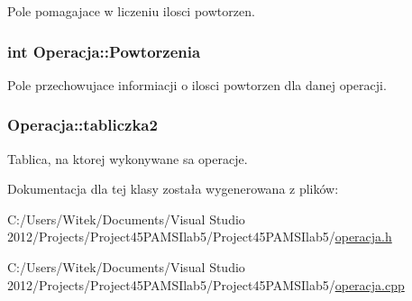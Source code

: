 Pole pomagajace w liczeniu ilosci powtorzen. 

\hypertarget{class_operacja_aa568b17d05f31132b3d97eb5b7e93d61}{
\subsubsection[{Powtorzenia}]{\setlength{\rightskip}{0pt plus 5cm}int Operacja\-::\-Powtorzenia}}\label{class_operacja_aa568b17d05f31132b3d97eb5b7e93d61}


Pole przechowujace informiacji o ilosci powtorzen dla danej operacji. 

\hypertarget{class_operacja_abf2eb42f0b32b1528939aa39e0ebd528}{
\subsubsection[{tabliczka2}]{ Operacja\-::tabliczka2}}\label{class_operacja_abf2eb42f0b32b1528939aa39e0ebd528}


Tablica, na ktorej wykonywane sa operacje. 



Dokumentacja dla tej klasy została wygenerowana z plików\-:\begin{DoxyCompactItemize}
\item 
C\-:/\-Users/\-Witek/\-Documents/\-Visual Studio 2012/\-Projects/\-Project45\-P\-A\-M\-S\-Ilab5/\-Project45\-P\-A\-M\-S\-Ilab5/\hyperlink{operacja_8h}{operacja.\-h}\item 
C\-:/\-Users/\-Witek/\-Documents/\-Visual Studio 2012/\-Projects/\-Project45\-P\-A\-M\-S\-Ilab5/\-Project45\-P\-A\-M\-S\-Ilab5/\hyperlink{operacja_8cpp}{operacja.\-cpp}\end{DoxyCompactItemize}
